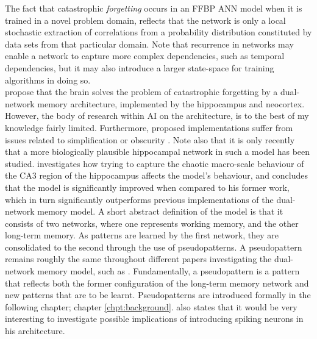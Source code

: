 The fact that catastrophic \textit{forgetting} occurs in an FFBP ANN model when it is trained in a novel problem domain, reflects that the network is only a local stochastic extraction of correlations from a probability distribution constituted by data sets from that particular domain. Note that recurrence in networks may enable a network to capture more complex dependencies, such as temporal dependencies, but it may also introduce a larger state-space for training algorithms in doing so.
\\


\citet{McClelland1995} propose that the brain solves the problem of catastrophic forgetting by a dual-network memory architecture, implemented by the hippocampus and neocortex. However, the body of research within AI on the architecture, is to the best of my knowledge fairly limited. Furthermore, proposed implementations suffer from issues related to simplification or obscurity \citep{French1997, French2001, Hattori2010, Hattori2014}. Note also that it is only recently that a more biologically plausible hippocampal network in such a model has been studied. \citet{Hattori2014} investigates how trying to capture the chaotic macro-scale behaviour of the CA3 region of the hippocampus affects the model's behaviour, and concludes that the model is significantly improved when compared to his former work, which in turn significantly outperforms previous implementations of the dual-network memory model. A short abstract definition of the model is that it consists of two networks, where one represents working memory, and the other long-term memory. As patterns are learned by the first network, they are consolidated to the second through the use of pseudopatterns. A pseudopattern remains roughly the same throughout different papers investigating the dual-network memory model, such as \citep{French1997, Ans2000, French2001, Hattori2010, Hattori2014}. Fundamentally, a pseudopattern is a pattern that reflects both the former configuration of the long-term memory network and new patterns that are to be learnt. Pseudopatterns are introduced formally in the following chapter; chapter \ref{chpt:background}.
\cite{Hattori2014} also states that it would be very interesting to investigate possible implications of introducing spiking neurons in his architecture.
\\

